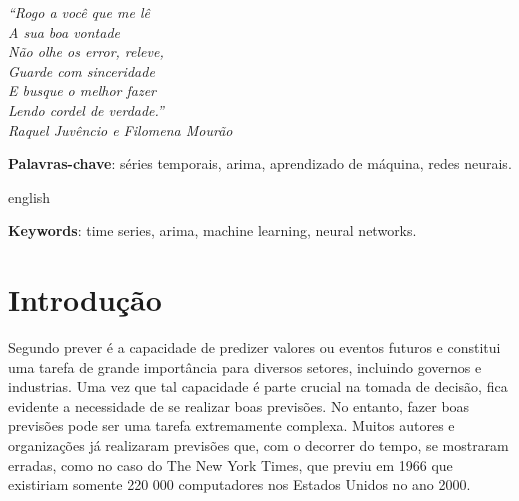 \documentclass[
    12pt,
    oneside,
    a4paper,
    english,
    brazil
]{abntex2}
\begin{document}
\frenchspacing

\imprimircapa{}

\imprimirfolhaderosto{}

\begin{epigrafe}
    \vspace*{\fill}
    \begin{flushright}
        \textit{``Rogo a você que me lê\\
        A sua boa vontade\\
        Não olhe os error, releve,\\
        Guarde com sinceridade\\
        E busque o melhor fazer\\
        Lendo cordel de verdade.''\\
        Raquel Juvêncio e Filomena Mourão}
    \end{flushright}
\end{epigrafe}

\begin{resumo}

    \textbf{Palavras-chave}: séries temporais, arima, aprendizado de máquina,
    redes neurais.
\end{resumo}

\begin{resumo}[Abstract]
    \begin{otherlanguage*}{english}

        \textbf{Keywords}: time series, arima, machine learning, neural
        networks.
    \end{otherlanguage*}
\end{resumo}

\textual{}

\tableofcontents*
\cleardoublepage{}

\chapter{Introdução}


Segundo  prever é a capacidade de predizer valores ou eventos
futuros e  constitui uma  tarefa de grande  importância para  diversos setores,
incluindo governos e industrias. Uma vez  que tal capacidade é parte crucial na
tomada de decisão,  fica evidente a necessidade de se  realizar boas previsões.
No entanto,  fazer boas  previsões pode ser  uma tarefa  extremamente complexa.
Muitos autores  e organizações já realizaram  previsões que, com o  decorrer do
tempo, se mostraram erradas, como no caso  do The New York Times, que previu em
1966  que existiriam  somente 220 000  computadores nos  Estados Unidos  no ano
2000.
\end{document}
